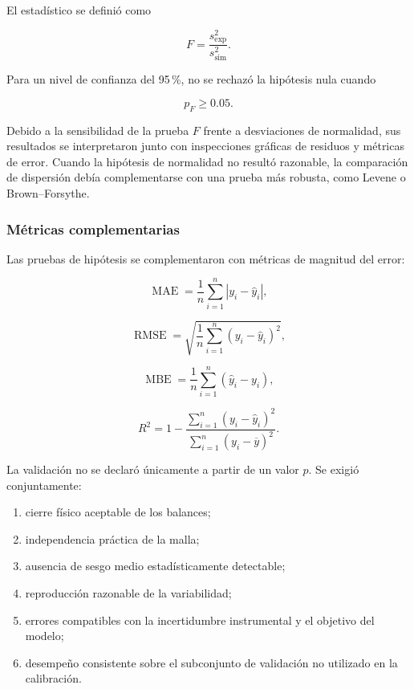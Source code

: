 El estadístico se definió como

\begin{equation}
F
=
\frac{s_{\mathrm{exp}}^2}
{s_{\mathrm{sim}}^2}.
\label{eq:f_test}
\end{equation}

Para un nivel de confianza del 95\,\%, no se rechazó la hipótesis nula cuando

\begin{equation}
p_F\geq 0.05.
\end{equation}

Debido a la sensibilidad de la prueba $F$ frente a desviaciones de normalidad, sus resultados se interpretaron junto con inspecciones gráficas de residuos y métricas de error. Cuando la hipótesis de normalidad no resultó razonable, la comparación de dispersión debía complementarse con una prueba más robusta, como Levene o Brown--Forsythe.

\subsubsection{Métricas complementarias}
\label{subsubsec:metricas_validacion}

Las pruebas de hipótesis se complementaron con métricas de magnitud del error:

\begin{equation}
\operatorname{MAE}
=
\frac{1}{n}
\sum_{i=1}^{n}
|y_i-\hat y_i|,
\end{equation}

\begin{equation}
\operatorname{RMSE}
=
\sqrt{
\frac{1}{n}
\sum_{i=1}^{n}
(y_i-\hat y_i)^2
},
\end{equation}

\begin{equation}
\operatorname{MBE}
=
\frac{1}{n}
\sum_{i=1}^{n}
(\hat y_i-y_i),
\end{equation}

\begin{equation}
R^2
=
1-
\frac{
\sum_{i=1}^{n}(y_i-\hat y_i)^2
}{
\sum_{i=1}^{n}(y_i-\overline{y})^2
}.
\end{equation}

La validación no se declaró únicamente a partir de un valor $p$. Se exigió conjuntamente:

\begin{enumerate}
    \item cierre físico aceptable de los balances;
    \item independencia práctica de la malla;
    \item ausencia de sesgo medio estadísticamente detectable;
    \item reproducción razonable de la variabilidad;
    \item errores compatibles con la incertidumbre instrumental y el objetivo del modelo;
    \item desempeño consistente sobre el subconjunto de validación no utilizado en la calibración.
\end{enumerate}

